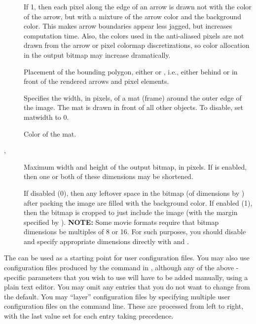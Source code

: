 \begin{description}
\item[]
 If 1, then each pixel along the edge of an arrow is
 drawn not with the color of the arrow, but with a mixture of the arrow
 color and the background color.  This makes arrow boundaries appear
 less jagged, but increases computation time.  Also, the colors used in
 the anti-aliased pixels are not drawn from the arrow or pixel colormap
 discretizations, so color allocation in the output bitmap may increase
 dramatically.
\item[]
 Placement of the bounding polygon, either  or ,
 i.e., either behind or in front of the rendered arrows and pixel
 elements.
\item[]
 Specifies the width, in pixels, of a mat (frame) around the outer edge
 of the image.  The mat is drawn in front of all other objects.  To
 disable, set matwidth to 0.
\item[]
 Color of the mat.
\item[, ]
 Maximum width and height of the output bitmap, in pixels.  If
  is enabled, then one or both of these dimensions may be
 shortened.
\item[]
 If disabled (0), then any leftover space in the bitmap (of dimensions
  by ) after packing the image are filled
 with the background color.  If enabled (1), then the bitmap is cropped
 to just include the image (with the margin specified by
 ).  {\bf NOTE:} Some movie formats require that
 bitmap dimensions be multiples of 8 or 16.  For such purposes, you
 should disable  and specify appropriate dimensions
 directly with  and .
\end{description}

The  can be used as a starting point for
user configuration files.  You may also use configuration files produced
by the  command in
, although any of the above
-specific parameters that you wish to use will have to be
added manually, using a plain text editor.  You may omit any entries
that you do not want to change from the default.  You may ``layer''
configuration files by specifying multiple user configuration files on
the command line.  These are processed from left to right, with the last
value set for each entry taking precedence.

